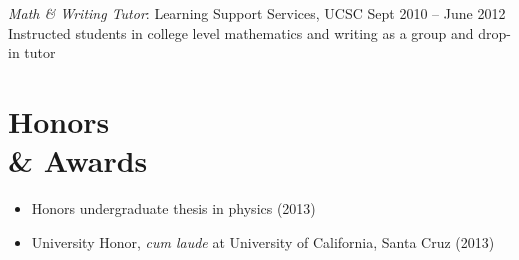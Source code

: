 \documentclass[margin,10pt]{res}
\begin{document}
\begin{resume}
                {\sl Math \& Writing Tutor}: Learning Support Services, UCSC   \hfill          Sept 2010 -- June 2012\\
                Instructed students in college level mathematics and writing as a group and drop-in tutor\\

                 
                                  
\section{Honors \\ \& Awards}
                 \begin{itemize}  \itemsep -1pt %
                    \item Honors undergraduate thesis in physics (2013)
                    \item University Honor, \textit{cum laude} at University of California, Santa Cruz (2013)\\
                 \end{itemize}  


\end{resume}
\end{document}
